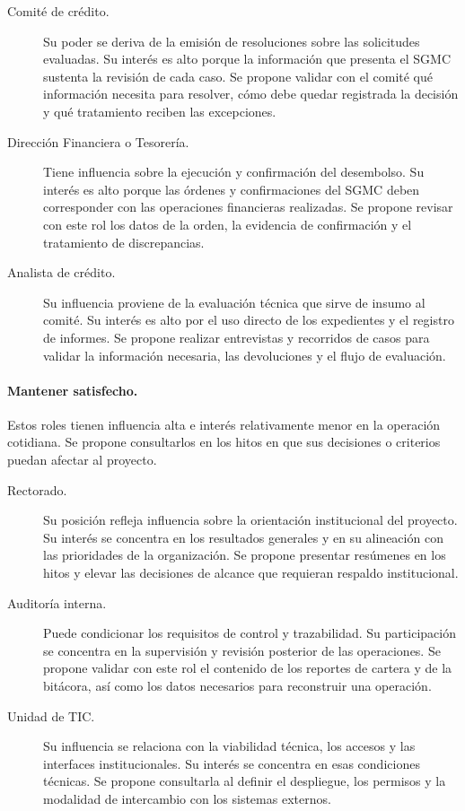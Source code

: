 \documentclass[11pt,a4paper]{article}
\begin{document}
\begin{description}
  \item[Comité de crédito.]
  Su poder se deriva de la emisión de resoluciones sobre las
  solicitudes evaluadas. Su interés es alto porque la información
  que presenta el SGMC sustenta la revisión de cada caso. Se propone
  validar con el comité qué información necesita para resolver, cómo
  debe quedar registrada la decisión y qué tratamiento reciben
  las excepciones.

  \item[Dirección Financiera o Tesorería.]
  Tiene influencia sobre la ejecución y confirmación del desembolso.
  Su interés es alto porque las órdenes y confirmaciones del SGMC
  deben corresponder con las operaciones financieras realizadas.
  Se propone revisar con este rol los datos de la orden, la evidencia
  de confirmación y el tratamiento de discrepancias.

  \item[Analista de crédito.]
  Su influencia proviene de la evaluación técnica que sirve de
  insumo al comité. Su interés es alto por el uso directo de los
  expedientes y el registro de informes. Se propone realizar
  entrevistas y recorridos de casos para validar la información
  necesaria, las devoluciones y el flujo de evaluación.
\end{description}

\paragraph{Mantener satisfecho.}
Estos roles tienen influencia alta e interés relativamente menor
en la operación cotidiana. Se propone consultarlos en los hitos en
que sus decisiones o criterios puedan afectar al proyecto.

\begin{description}
  \item[Rectorado.]
  Su posición refleja influencia sobre la orientación institucional
  del proyecto. Su interés se concentra en los resultados generales
  y en su alineación con las prioridades de la organización. Se
  propone presentar resúmenes en los hitos y elevar las decisiones
  de alcance que requieran respaldo institucional.

  \item[Auditoría interna.]
  Puede condicionar los requisitos de control y trazabilidad. Su
  participación se concentra en la supervisión y revisión posterior
  de las operaciones. Se propone validar con este rol el contenido
  de los reportes de cartera y de la bitácora, así como los datos
  necesarios para reconstruir una operación.

  \item[Unidad de TIC.]
  Su influencia se relaciona con la viabilidad técnica, los accesos
  y las interfaces institucionales. Su interés se concentra en esas
  condiciones técnicas. Se propone consultarla al definir el
  despliegue, los permisos y la modalidad de intercambio con
  los sistemas externos.
\end{description}
\end{document}

